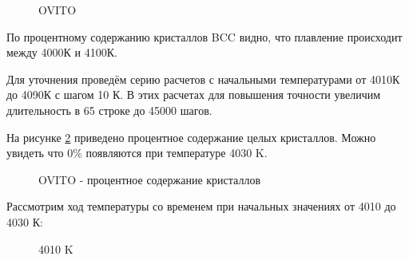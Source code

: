 \documentclass[a4paper,oneside,14pt]{extreport}
\begin{document}
\newpage
\begin{figure}[h]
	\caption{OVITO}
	\label{ovito}
\end{figure}

По процентному содержанию кристаллов BCC видно, что плавление происходит между 4000К и 4100К.

Для уточнения проведём серию расчетов с начальными температурами от 4010К до
4090К с шагом 10 К. В этих расчетах для повышения точности увеличим
длительность в 65 строке до 45000 шагов.

На рисунке \ref{ovito2} приведено процентное содержание целых кристаллов. Можно увидеть что 0\% появляются при температуре 4030 K.

\begin{figure}[h]
	\caption{OVITO - процентное содержание кристаллов}
	\label{ovito2}
\end{figure}

\newpage
Рассмотрим ход температуры со временем при начальных значениях от 4010 до
4030 К:

\begin{figure}[!h]
	\caption{4010 K}
	\label{untitled1}
\end{figure}
\end{document}
